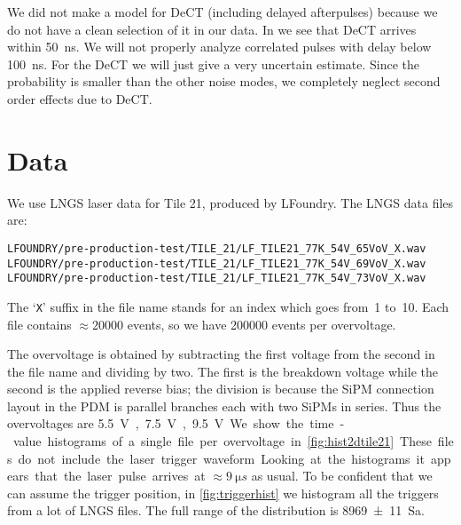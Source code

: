 We did not make a model for DeCT (including delayed afterpulses) because we do
not have a clean selection of it in our data. In
\cite[fig.~3.8~p.~54]{savarese2018} we see that DeCT arrives within
\SI{50}{ns}. We will not properly analyze correlated pulses with delay below
\SI{100}{ns}. For the DeCT we will just give a very uncertain estimate. Since
the probability is smaller than the other noise modes, we completely neglect
second order effects due to DeCT.

\section{Data}

We use LNGS laser data for Tile 21, produced by LFoundry. The LNGS data files
are:
%
\begin{verbatim}
LFOUNDRY/pre-production-test/TILE_21/LF_TILE21_77K_54V_65VoV_X.wav
LFOUNDRY/pre-production-test/TILE_21/LF_TILE21_77K_54V_69VoV_X.wav
LFOUNDRY/pre-production-test/TILE_21/LF_TILE21_77K_54V_73VoV_X.wav
\end{verbatim}
%
The `\texttt{X}' suffix in the file name stands for an index which goes from~1
to~10. Each file contains $\approx\num{20000}$ events, so we have \num{200000}
events per overvoltage.

The overvoltage is obtained by subtracting the first voltage from the second in
the file name and dividing by two. The first is the breakdown voltage while the
second is the applied reverse bias; the division is because the SiPM connection
layout in the PDM is parallel branches each with two SiPMs in series. Thus the
overvoltages are \SI{5.5}V, \SI{7.5}V, \SI{9.5}V.

We show the time-value histograms of a single file per overvoltage in
\autoref{fig:hist2dtile21}. These files do not include the laser trigger
waveform. Looking at the histograms it appears that the laser pulse arrives at
$\approx\SI{9}{\micro s}$ as usual. To be confident that we can assume the
trigger position, in \autoref{fig:triggerhist} we histogram all the triggers
from a lot of LNGS files. The full range of the distribution is
\SI[separate-uncertainty=true]{8969 \pm 11}{Sa}.

\begin{figure}
    
    
    
\end{figure}

